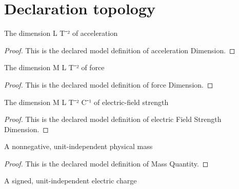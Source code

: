 \section{Declaration topology}
\begin{definition}
  \label{def:physics:phyx-mini-0904:phyxminiproblems-problemphyxmini0904-accelerationdimension}
  The dimension L T⁻² of acceleration
\end{definition}
\begin{proof}
  This is the declared model definition of acceleration Dimension.
\end{proof}
\begin{definition}
  \label{def:physics:phyx-mini-0904:phyxminiproblems-problemphyxmini0904-forcedimension}
  The dimension M L T⁻² of force
\end{definition}
\begin{proof}
  This is the declared model definition of force Dimension.
\end{proof}
\begin{definition}
  \label{def:physics:phyx-mini-0904:phyxminiproblems-problemphyxmini0904-electricfieldstrengthdimension}
  The dimension M L T⁻² C⁻¹ of electric-field strength
\end{definition}
\begin{proof}
  This is the declared model definition of electric Field Strength Dimension.
\end{proof}
\begin{definition}
  \label{def:physics:phyx-mini-0904:phyxminiproblems-problemphyxmini0904-massquantity}
  A nonnegative, unit-independent physical mass
\end{definition}
\begin{proof}
  This is the declared model definition of Mass Quantity.
\end{proof}
\begin{definition}
  \label{def:physics:phyx-mini-0904:phyxminiproblems-problemphyxmini0904-signedchargequantity}
  A signed, unit-independent electric charge
\end{definition}
